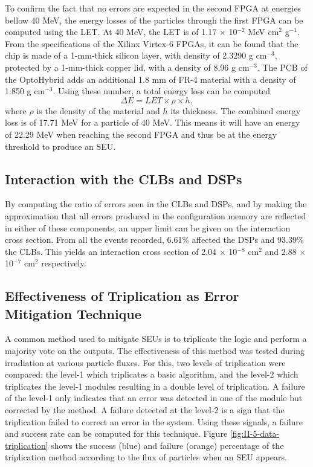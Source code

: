      To confirm the fact that no errors are expected in the second FPGA at energies bellow 40 MeV, the energy losses of the particles through the first FPGA can be computed using the LET. At 40 MeV, the LET is of 1.17 $ \times $ 10$^{-2} $ MeV cm$^{2}$ g$^{-1}$. From the specifications of the Xilinx Virtex-6 FPGAs, it can be found that the chip is made of a 1-mm-thick silicon layer, with density of 2.3290 g cm$^{-3}$, protected by a 1-mm-thick copper lid, with a density of 8.96 g cm$^{-3}$. The PCB of the OptoHybrid adds an additional 1.8 mm of FR-4 material with a density of 1.850 g cm$^{-3}$. Using these number, a total energy loss can be computed
      \begin{equation}
        \Delta E = LET \times \rho \times h,
      \end{equation}
      where $\rho$ is the density of the material and $ h $ its thickness. The combined energy loss is of 17.71 MeV for a particle of 40 MeV. This means it will have an energy of 22.29 MeV when reaching the second FPGA and thus be at the energy threshold to produce an SEU.

    \subsection{Interaction with the CLBs and DSPs}

      By computing the ratio of errors seen in the CLBs and DSPs, and by making the approximation that all errors produced in the configuration memory are reflected in either of these components, an upper limit can be given on the interaction cross section. From all the events recorded, 6.61\% affected the DSPs and 93.39\% the CLBs. This yields an interaction cross section of 2.04 $ \times $ 10$^{-8}$ cm$^{2}$ and 2.88 $ \times $ 10$^{-7}$ cm$^{2}$ respectively.

    \subsection{Effectiveness of Triplication as Error Mitigation Technique}

      A common method used to mitigate SEUs is to triplicate the logic and perform a majority vote on the outputs. The effectiveness of this method was tested during irradiation at various particle fluxes. For this, two levels of triplication were compared: the level-1 which triplicates a basic algorithm, and the level-2 which triplicates the level-1 modules resulting in a double level of triplication. A failure of the level-1 only indicates that an error was detected in one of the module but corrected by the method. A failure detected at the level-2 is a sign that the triplication failed to correct an error in the system. Using these signals, a failure and success rate can be computed for this technique. Figure \ref{fig:II-5-data-triplication} shows the success (blue) and failure (orange) percentage of the triplication method according to the flux of particles when an SEU appears. \\

